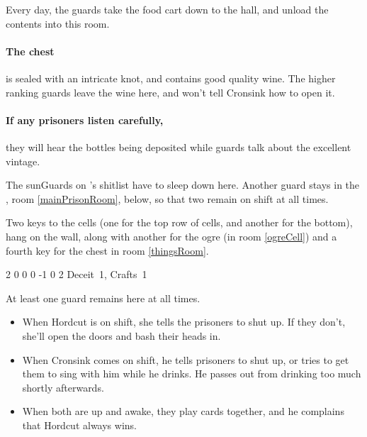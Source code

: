 
Every day, the guards take the food cart down to the hall, and unload the contents into this room.

\paragraph{The chest}
is sealed with an intricate knot, and contains good quality wine.
The higher ranking guards leave the wine here, and won't tell Cronsink how to open it.

\paragraph{If any prisoners listen carefully,}
they will hear the bottles being deposited while guards talk about the excellent vintage.


The \glspl{sunGuard} on 's shitlist have to sleep down here.
Another guard stays in the , room \ref{mainPrisonRoom}, below, so that two remain on shift at all times.

Two keys to the cells (one for the top row of cells, and another for the bottom), hang on the wall, along with another for the ogre (in room \ref{ogreCell}) and a fourth key for the chest in room \ref{thingsRoom}.

{2}%
{0}%
{{0}%
{0}%
{-1}}%
{0}%
{2}%
{
  Deceit~1, Crafts~1
  \knacks{\brawler, \berserker}
}%
{\shortsword}%
{}


At least one guard remains here at all times.
\begin{itemize}

  \item
  When Hordcut is on shift, she tells the prisoners to shut up.
  If they don't, she'll open the doors and bash their heads in.
  \item
  When Cronsink comes on shift, he tells prisoners to shut up, or tries to get them to sing with him while he drinks.
  He passes out from drinking too much shortly afterwards.
  \item
  When both are up and awake, they play cards together, and he complains that Hordcut always wins.

\end{itemize}

